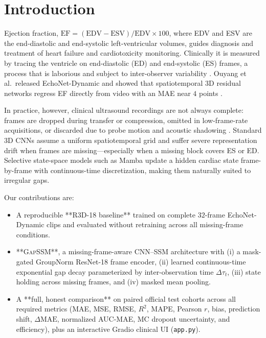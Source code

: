 \documentclass[conference]{IEEEtran}
\begin{document}
\section{Introduction}
Ejection fraction, $\text{EF} = (\text{EDV}-\text{ESV})/\text{EDV}\times 100$, where EDV and ESV are the end-diastolic and end-systolic left-ventricular volumes, guides diagnosis and treatment of heart failure and cardiotoxicity monitoring. Clinically it is measured by tracing the ventricle on end-diastolic (ED) and end-systolic (ES) frames, a process that is laborious and subject to inter-observer variability \cite{ouyang2020video}. Ouyang et al.\ released EchoNet-Dynamic \cite{ouyang2019echonet} and showed that spatiotemporal 3D residual networks regress EF directly from video with an MAE near $4$ points \cite{ouyang2020video}.

In practice, however, clinical ultrasound recordings are not always complete: frames are dropped during transfer or compression, omitted in low-frame-rate acquisitions, or discarded due to probe motion and acoustic shadowing \cite{fang2025echoforge,wang2025osa,project6spec}. Standard 3D CNNs assume a uniform spatiotemporal grid and suffer severe representation drift when frames are missing—especially when a missing block covers ES or ED. Selective state-space models such as Mamba \cite{gu2023mamba} update a hidden cardiac state frame-by-frame with continuous-time discretization, making them naturally suited to irregular gaps.

Our contributions are:
\begin{itemize}
    \item A reproducible **R3D-18 baseline** trained on complete $32$-frame EchoNet-Dynamic clips and evaluated without retraining across all missing-frame conditions.
    \item **\textsc{GapSSM}**, a missing-frame-aware CNN--SSM architecture with (i) a mask-gated GroupNorm ResNet-18 frame encoder, (ii) learned continuous-time exponential gap decay parameterized by inter-observation time $\Delta\tau_t$, (iii) state holding across missing frames, and (iv) masked mean pooling.
    \item A **full, honest comparison** on paired official test cohorts across all required metrics (MAE, MSE, RMSE, $R^2$, MAPE, Pearson $r$, bias, prediction shift, $\Delta\text{MAE}$, normalized AUC-MAE, MC dropout uncertainty, and efficiency), plus an interactive Gradio clinical UI (\texttt{app.py}).
\end{itemize}
\end{document}

